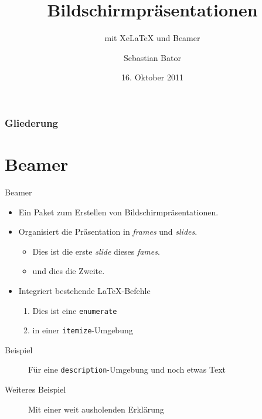 \documentclass[11pt]{beamer}
\author[Eremit7]{Sebastian Bator}
\title[XeLaTeX und beamer]{Bildschirmpräsentationen}
\subtitle{mit XeLaTeX und Beamer}
\institute{Ubuntu Berlin}
\date{16. Oktober 2011}
\begin{document}
\begin{frame}
\titlepage
\end{frame}

\begin{frame}
	\frametitle{Gliederung}
	\tableofcontents
\end{frame}

\section{Beamer}

\begin{frame}{Beamer}
	\begin{itemize}
		\item Ein Paket zum Erstellen von Bildschirmpräsentationen.
		\item Organisiert die Präsentation in \emph{frames} und \emph{slides}.
			\begin{itemize}
				\item<1> Dies ist die erste \emph{slide} dieses \emph{fames}.
				\item<2-> und dies die Zweite.
			\end{itemize}
		\item Integriert \alert{bestehende} \LaTeX-Befehle
			\begin{enumerate}
				\item Dies ist eine \texttt{enumerate}
				\item in einer \texttt{itemize}-Umgebung
			\end{enumerate}
	\end{itemize}
	\begin{description}
		\item[Beispiel] Für eine \texttt{description}-Umgebung und noch etwas Text
		\item[Weiteres Beispiel] Mit einer weit ausholenden Erklärung
	\end{description}
\end{frame}
\end{document}
